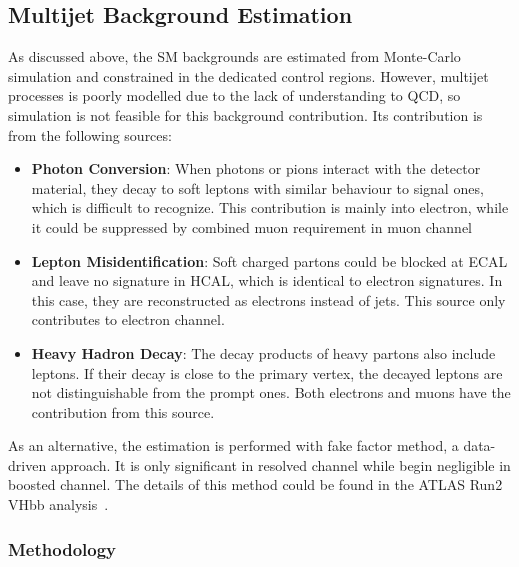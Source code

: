 \subsection{Multijet Background Estimation}
\label{sec:multijet_background}
As discussed above, the SM backgrounds are estimated from Monte-Carlo simulation and constrained in the dedicated control regions. However, multijet processes is poorly modelled due to the lack of understanding to QCD, so simulation is not feasible for this background contribution. Its contribution is from the following sources:
\begin{itemize}
	\item {\bf Photon Conversion}: When photons or pions interact with the detector material, they decay to soft leptons with similar behaviour to signal ones, which is difficult to recognize. This contribution is mainly into electron, while it could be suppressed by combined muon requirement in muon channel
	\item {\bf Lepton Misidentification}: Soft charged partons could be blocked at ECAL and leave no signature in HCAL, which is identical to electron signatures. In this case, they are reconstructed as electrons instead of jets. This source only contributes to electron channel.
	\item {\bf Heavy Hadron Decay}: The decay products of heavy partons also include leptons. If their decay is close to the primary vertex, the decayed leptons are not distinguishable from the prompt ones. Both electrons and muons have the contribution from this source. 
\end{itemize}
\noindent
As an alternative, the estimation is performed with fake factor method, a data-driven approach. It is only significant in resolved channel while begin negligible in boosted channel.  The details of this method could be found in the ATLAS Run2 VHbb analysis~\cite{ATLAS-CONF-2016-091, ATL-COM-PHYS-2016-429}. 

\subsubsection*{Methodology}

